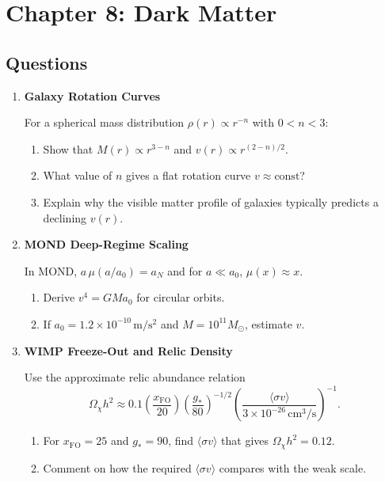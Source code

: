 \clearpage
\section{Chapter 8: Dark Matter}

\subsection{Questions}

\begin{enumerate}[label=8.\arabic*]
  \item \label{q:8.1} \textbf{Galaxy Rotation Curves}
  
  For a spherical mass distribution $\rho(r)\propto r^{-n}$ with $0<n<3$:
  \begin{enumerate}[label=(\alph*)]
    \item Show that $M(r)\propto r^{3-n}$ and $v(r)\propto r^{(2-n)/2}$.
    \item What value of $n$ gives a flat rotation curve $v\approx \text{const}$?
    \item Explain why the visible matter profile of galaxies typically predicts a declining $v(r)$.
  \end{enumerate}

  \item \label{q:8.2} \textbf{MOND Deep-Regime Scaling}
  
  In MOND, $a\,\mu(a/a_0)=a_N$ and for $a\ll a_0$, $\mu(x)\approx x$.
  \begin{enumerate}[label=(\alph*)]
    \item Derive $v^4 = G M a_0$ for circular orbits.
    \item If $a_0 = 1.2\times10^{-10}\,\mathrm{m/s^2}$ and $M=10^{11}M_\odot$, estimate $v$.
  \end{enumerate}

  \item \label{q:8.3} \textbf{WIMP Freeze-Out and Relic Density}
  
  Use the approximate relic abundance relation
  \[
    \Omega_\chi h^2 \approx 0.1\left(\frac{x_{\mathrm{FO}}}{20}\right)
    \left(\frac{g_*}{80}\right)^{-1/2}
    \left(\frac{\langle\sigma v\rangle}{3\times10^{-26}\,\mathrm{cm^3/s}}\right)^{-1}.
  \]
  \begin{enumerate}[label=(\alph*)]
    \item For $x_{\mathrm{FO}}=25$ and $g_*=90$, find $\langle\sigma v\rangle$ that gives $\Omega_\chi h^2=0.12$.
    \item Comment on how the required $\langle\sigma v\rangle$ compares with the weak scale.
  \end{enumerate}


\end{enumerate}
